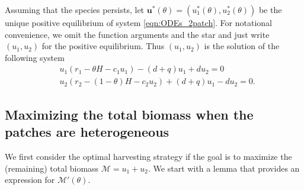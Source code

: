 \documentclass[11pt]{article}
\def\MM{\mathcal{M}}
\theoremstyle{definition}
\begin{document}
Assuming that the species persists, let $\bm u^*(\theta) = (u_1^*(\theta),u_2^*(\theta))$ be the unique positive equilibrium of system \eqref{eqn:ODEs_2patch}. For notational convenience, we omit the function arguments and the star and just write $(u_1,u_2)$ for the positive equilibrium. Thus $(u_1,u_2)$ is the solution of the following system
\begin{subequations}
\begin{align}
    &u_1(r_1-\theta H -c_1u_1) -(d+q)u_1+du_2=0\label{eqn:u1}\\
    &u_2(r_2-(1-\theta)H -c_2u_2)+(d+q)u_1-du_2=0\label{eqn:u2}.
\end{align}    
\end{subequations}


\subsection{Maximizing the total biomass when the patches are heterogeneous}\label{sec:biomass_het}
We first consider the optimal harvesting strategy if the goal is to maximize the (remaining) total biomass $\MM=u_1+u_2$. We start with a lemma that provides an expression for $\MM'(\theta)$.
\end{document}

